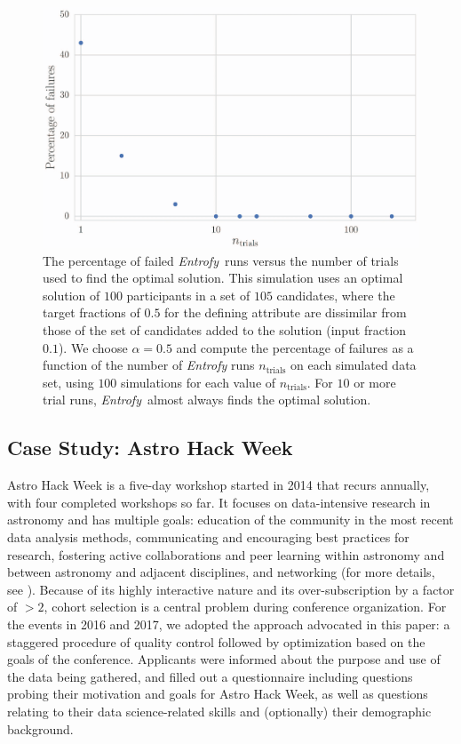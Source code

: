 \documentclass[10pt,letterpaper]{article}
\newcommand{\project}[1]{\textsl{#1}}
\newcommand{\entrofy}{\project{Entrofy}}
\begin{document}
\begin{figure}[htbp]
\begin{center}
\includegraphics[width=5in]{Fig3.eps}
\caption{The percentage of failed \entrofy\ runs versus the number of 
trials used to find the optimal solution. This simulation uses an optimal solution of $100$ participants in a set of $105$ candidates, where the target fractions of $0.5$ for the defining attribute are dissimilar from those of the set of candidates added to the solution (input fraction $0.1$). We choose $\alpha = 0.5$ and compute the percentage of failures as a function of the number of \textit{Entrofy} runs $n_\mathrm{trials}$ on each simulated data set, using $100$ simulations for each value of $n_\mathrm{trials}$.
For $10$ or more trial runs, \entrofy\ almost always finds the optimal solution.}
\label{fig:experiments2}
\end{center}
\end{figure}


\subsection*{Case Study: Astro Hack Week}
\label{sec:casestudy}

Astro Hack Week is a five-day workshop started in 2014 that recurs annually, with four completed workshops so far. It focuses on data-intensive research in astronomy and has multiple goals: education of the community in the most recent data analysis methods, communicating and encouraging best practices for research, fostering active collaborations and peer learning within astronomy and between astronomy and adjacent disciplines, and networking (for more details, see \citep{hackweekpaper}). Because of its highly interactive nature and its over-subscription by a factor of $>2$, cohort selection is a central problem during conference organization. For the events in 2016 and 2017, we adopted the approach advocated in this paper: a staggered procedure of quality control followed by optimization based on the goals of the conference. Applicants were informed about the purpose and use of the data being gathered, and filled out a questionnaire including questions probing their motivation and goals for Astro Hack Week, as well as questions relating to their data science-related skills and (optionally) their demographic background.
\end{document}
